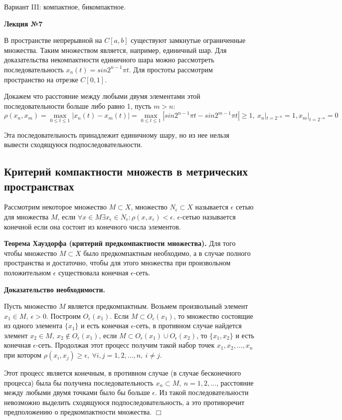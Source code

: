 \documentclass[14pt,a4paper]{extarticle}
\theoremstyle{definition}
\theoremstyle{remark}
\renewcommand{\[}{\begin{dmath*}[compact]}
\renewcommand{\]}{\end{dmath*}}
\newcommand{\sep}{ , \ \allowbreak }
\newcommand{\tth}[1][]{\textbf{Теорема#1.}}
\newcommand{\btev}[1][]{\textbf{Доказательство#1.}
}
\newcommand{\etev}{$\Box$}
\begin{document}
Вариант III: компактное, бикомпактное.

\textbf{Лекция №7}

В пространстве непрерывной на $C[a,b]$ существуют замкнутые ограниченные множества. Таким множеством является, например, единичный шар. Для доказательства некомпактности единичного шара можно рассмотреть последовательность $x_n(t)=sin2^{n-1}\pi t$. Для простоты рассмотрим пространство на отрезке $C[0,1]$.

Докажем что расстояние между любыми двумя элементами этой последовательности больше либо равно 1, пусть $m>n$:
\[ {\rho(x_n,x_m)} = {\max_{0\leq t \leq 1} |x_n(t)-x_m(t)|} = \max_{0\leq t \leq 1} |sin 2^{n-1}\pi t-\allowbreak sin 2^{m-1}\pi t|\geq 1 \sep x_n|_{t=2^{-n}}=1, x_m|_{t=2^{-n}}=0 \]

Эта последовательность принадлежит единичному шару, но из нее нельзя вывести сходящуюся подпоследовательности.

\subsection{Критерий компактности множеств в метрических пространствах}

Рассмотрим некоторое множество $M\subset X$, множество $N_{\epsilon} \subset X$ называется $\epsilon$ сетью для множества $M$, если $\forall x \in M \exists x_{\epsilon} \in N_{\epsilon}: \rho(x,x_{\epsilon})<\epsilon$. $\epsilon$-сетью называется конечной если она состоит из конечного числа элементов.

\tth[ Хауздорфа (критерий предкомпактности множества)] Для того чтобы множество $M\subset X$ было предкомпактным необходимо, а в случае полного пространства и достаточно, чтобы для этого множества при произвольном положительном $\epsilon$ существовала конечная $\epsilon$-сеть.

\btev[ необходимости]
  Пусть множество $M$ является предкомпактным. Возьмем произвольный элемент $x_1 \in M\sep \epsilon > 0$.
  Построим $O_{\epsilon}(x_1)$. Если $M \subset O_{\epsilon}(x_1)$, то множество состоящие из одного элемента $\{x_1\}$ и есть конечная $\epsilon$-сеть, в противном случае найдется элемент $x_2 \in M\sep x_2 \not\in O_\epsilon(x_1)$, если $M\subset O_\epsilon(x_1)\cup O_\epsilon(x_2)$, то $\{x_1,x_2\}$ и есть конечная $\epsilon$-сеть. Продолжая этот процесс получим такой набор точек $x_1, x_2,\dots,x_n$ при котором $\rho(x_i,x_j)\geq \epsilon\sep \forall i,j=1,2,\dots,n\sep i\neq j$.

  Этот процесс является конечным, в противном случае (в случае бесконечного процесса) была бы получена последовательность ${x_n}\subset M\sep n=1,2,\dots$, расстояние между любыми двумя точками было бы больше $\epsilon$. Из такой последовательности невозможно выделить сходящуюся подпоследовательность, а это противоречит предположению о предкомпактности множества.
\etev
\end{document}
